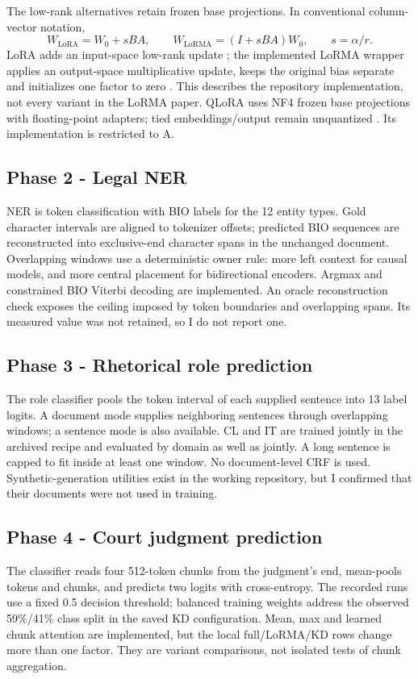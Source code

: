 \documentclass[11pt, oneside]{article}
\begin{document}
The low-rank alternatives retain frozen base projections. In conventional column-vector notation,
\[
W_{\mathrm{LoRA}}=W_0+sBA,\qquad
W_{\mathrm{LoRMA}}=(I+sBA)W_0,\qquad s=\alpha/r.
\]
LoRA adds an input-space low-rank update \cite{lora}; the implemented LoRMA wrapper applies an
output-space multiplicative update, keeps the original bias separate and initializes one factor to zero
\cite{lorma}. This describes the repository implementation, not every variant in the LoRMA paper.
QLoRA uses NF4 frozen base projections with floating-point adapters; tied embeddings/output remain
unquantized \cite{qlora}. Its implementation is restricted to A.

\subsection{Phase 2 - Legal NER}
NER is token classification with BIO labels for the 12 entity types. Gold character intervals are aligned
to tokenizer offsets; predicted BIO sequences are reconstructed into exclusive-end character spans in
the unchanged document. Overlapping windows use a deterministic owner rule: more left context for
causal models, and more central placement for bidirectional encoders. Argmax and constrained BIO
Viterbi decoding are implemented. An oracle reconstruction check exposes the ceiling imposed by token
boundaries and overlapping spans. Its measured value was not retained, so I do not report one.

\subsection{Phase 3 - Rhetorical role prediction}
The role classifier pools the token interval of each supplied sentence into 13 label logits. A document
mode supplies neighboring sentences through overlapping windows; a sentence mode is also available.
CL and IT are trained jointly in the archived recipe and evaluated by domain as well as jointly. A long
sentence is capped to fit inside at least one window. No document-level CRF is used. Synthetic-generation
utilities exist in the working repository, but I confirmed that their documents were not used in training.

\subsection{Phase 4 - Court judgment prediction}
The classifier reads four 512-token chunks from the judgment's end, mean-pools tokens and chunks,
and predicts two logits with cross-entropy. The recorded runs use a fixed 0.5 decision threshold;
balanced training weights address the observed 59\%/41\% class split in the saved KD configuration.
Mean, max and learned chunk attention are implemented, but the local full/LoRMA/KD rows change more
than one factor. They are variant comparisons, not isolated tests of chunk aggregation.
\end{document}
